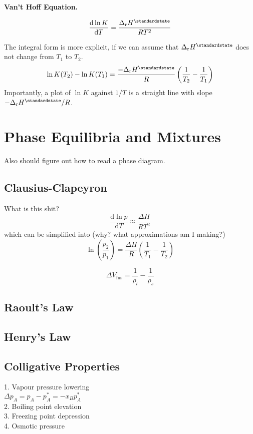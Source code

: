 \textbf{Van't Hoff Equation.}

\begin{equation*}
    \odv{\ln K}{T} = \frac{\Delta_{\mathrm{r}}H^\standardstate}{RT^2}
\end{equation*}

The integral form is more explicit, if we can assume that $\Delta_{\mathrm{r}}H^\standardstate$ does not change from $T_1$ to $T_2$.
\begin{equation*}
    \ln K (T_2) - \ln K (T_1) = \frac{-\Delta_{\mathrm{r}}H^\standardstate}{R} \left(\frac{1}{T_2} - \frac{1}{T_1}\right)
\end{equation*}
Importantly, a plot of $\ln K$ against $1/T$ is a straight line with slope $-\Delta_{\mathrm{r}}H^\standardstate / R$.

\section{Phase Equilibria and Mixtures}

Also should figure out how to read a phase diagram.

\subsection*{Clausius-Clapeyron}
What is this shit?
\begin{equation*}
    \frac{\mathrm{d}\ln p}{\mathrm{d}T} \approx \frac{\Delta H}{RT^2}
\end{equation*}
which can be simplified into (why? what approximations am I making?)
\begin{equation*}
    \ln\left(\frac{p_2}{p_1}\right) = \frac{\Delta H}{R}\left(\frac{1}{T_1} - \frac{1}{T_2}\right)
\end{equation*}

\begin{equation*}
    \Delta V_{\mathrm{fus}} = \frac{1}{\rho_l} - \frac{1}{\rho_s}
\end{equation*}

\subsection*{Raoult's Law}

\subsection*{Henry's Law}

\subsection*{Colligative Properties}
1. Vapour pressure lowering \\
$\Delta p_A = p_A - p^{*}_{A} = -x_B p^*_A$ \\
2. Boiling point elevation \\
3. Freezing point depression \\
4. Osmotic pressure \\

